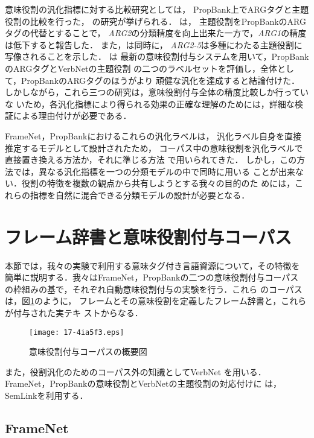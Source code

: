 \documentclass[japanese]{jnlp_1.4}
\begin{document}
意味役割の汎化指標に対する比較研究としては，
PropBank上でARGタグと主題役割の比較を行った，
の研究が挙げられる．
は，
主題役割をPropBankのARGタグの代替とすることで，
{\it ARG2}の分類精度を向上出来た一方で，{\it ARG1}の精度は低下すると報告した．
また，は同時に，
{\it ARG2-5}は多種にわたる主題役割に写像されることを示した．
は
最新の意味役割付与システムを用いて，PropBankのARGタグとVerbNetの主題役割
の二つのラベルセットを評価し，全体として，PropBankのARGタグのほうがより
頑健な汎化を達成すると結論付けた．
しかしながら，これら三つの研究は，意味役割付与全体の精度比較しか行っていな
いため，各汎化指標により得られる効果の正確な理解のためには，詳細な検
証による理由付けが必要である．

FrameNet，PropBankにおけるこれらの汎化ラベルは，
汎化ラベル自身を直接推定するモデルとして設計されたため，
コーパス中の意味役割を汎化ラベルで直接置き換える方法か，それに準じる方法
で用いられてきた．
しかし，この方法では，異なる汎化指標を一つの分類モデルの中で同時に用いる
ことが出来ない．役割の特徴を複数の観点から共有しようとする我々の目的のた
めには，これらの指標を自然に混合できる分類モデルの設計が必要となる．


\section{フレーム辞書と意味役割付与コーパス}

本節では，我々の実験で利用する意味タグ付き言語資源について，その特徴を
簡単に説明する．我々はFrameNet，PropBankの二つの意味役割付与コーパス
の枠組みの基で，それぞれ自動意味役割付与の実験を行う．これら
のコーパスは，図\ref{fig:semantic-corpus}のように，
フレームとその意味役割を定義したフレーム辞書と，これらが付与された実テキ
ストからなる．

\begin{figure}[b]
\begin{center}
\texttt{[image: 17-4ia5f3.eps]}
\end{center}
\caption{意味役割付与コーパスの概要図}
\label{fig:semantic-corpus}
\end{figure}

また，役割汎化のためのコーパス外の知識としてVerbNet
を用いる．FrameNet，PropBankの意味役割とVerbNetの主題役割の対応付けに
は，SemLinkを利用する．


\subsection{FrameNet}
\label{sec:framenet}
\end{document}
